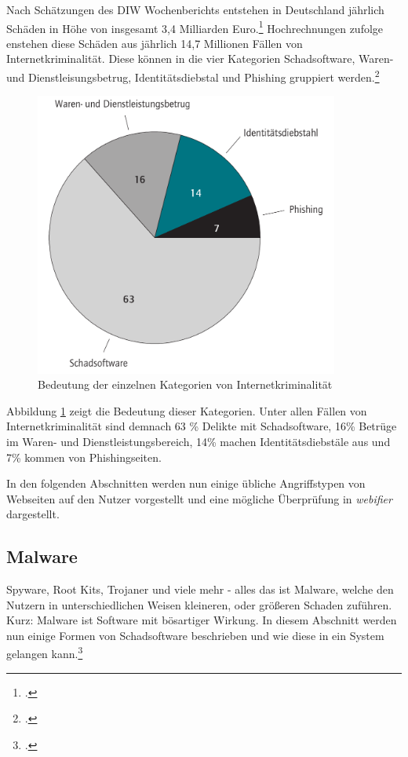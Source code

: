 Nach Schätzungen des DIW Wochenberichts entstehen in Deutschland jährlich Schäden in Höhe von insgesamt 3,4 Milliarden Euro.\footcite[Vgl.][301]{cybercrime} Hochrechnungen zufolge enstehen diese Schäden aus jährlich 14,7 Millionen Fällen von Internetkriminalität. Diese können in die vier Kategorien Schadsoftware, Waren- und Dienstleisungsbetrug, Identitätsdiebstal und Phishing gruppiert werden.\footcite[Vgl.][297]{cybercrime}

\begin{figure}[H]
  \centering
  \includegraphics[width=10cm]{images/kategorien-cybercrime}
  \caption[Bedeutung der einzelnen Kategorien von Internetkriminalität]{Bedeutung der einzelnen Kategorien von Internetkriminalität\protect\footnotemark}
  \label{fig:categories-cybercrime}
\end{figure}

Abbildung \ref{fig:categories-cybercrime} zeigt die Bedeutung dieser Kategorien. Unter allen Fällen
von Internetkriminalität sind demnach 63 \% Delikte mit Schadsoftware, 16\% Betrüge im Waren-
und Dienstleistungsbereich, 14\% machen Identitätsdiebstäle aus und 7\% kommen von Phishingseiten.

In den folgenden Abschnitten werden nun einige übliche Angriffstypen von Webseiten auf den Nutzer
vorgestellt und eine mögliche Überprüfung in \textit{webifier} dargestellt.

\subsection{Malware}

Spyware, Root Kits, Trojaner und viele mehr - alles das ist Malware, welche den Nutzern in unterschiedlichen Weisen kleineren, oder größeren Schaden zuführen. Kurz: Malware ist Software mit bösartiger Wirkung. In diesem Abschnitt werden nun einige Formen von Schadsoftware beschrieben und wie diese in ein System gelangen kann.\footcite[Vgl.][95]{netzwerkDatensicherheit}

